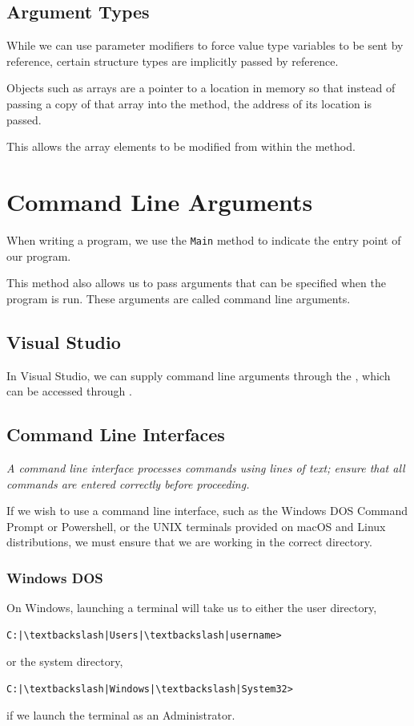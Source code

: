 \documentclass{article}
\begin{document}
\subsection{Argument Types}
While we can use parameter modifiers to force value type variables to
be sent by reference, certain structure types are implicitly passed by
reference.

Objects such as arrays are a pointer to a location in memory so that
instead of passing a copy of that array into the method, the address of
its location is passed.

This allows the array elements to be modified from within the method.
\section{Command Line Arguments}
When writing a program, we use the \texttt{Main} method to
indicate the entry point of our program.

This method also allows us to pass arguments that can be specified when
the program is run. These arguments are called command line arguments.
\subsection{Visual Studio}
In Visual Studio, we can supply command line arguments through the
, which can be accessed through
.
\subsection{Command Line Interfaces}
\emph{A command line interface processes commands using lines of text;
    ensure that all commands are entered correctly before proceeding.}

If we wish to use a command line interface, such as the Windows DOS
Command Prompt or Powershell, or the UNIX terminals provided on macOS
and Linux distributions, we must ensure that we are working in the
correct directory.
\subsubsection{Windows DOS}
On Windows, launching a terminal will take us to either the user
directory,
\begin{verbatim}
C:|\textbackslash|Users|\textbackslash|username>
\end{verbatim}
or the system directory,
\begin{verbatim}
C:|\textbackslash|Windows|\textbackslash|System32>
\end{verbatim}
if we launch the terminal as an Administrator.
\end{document}

